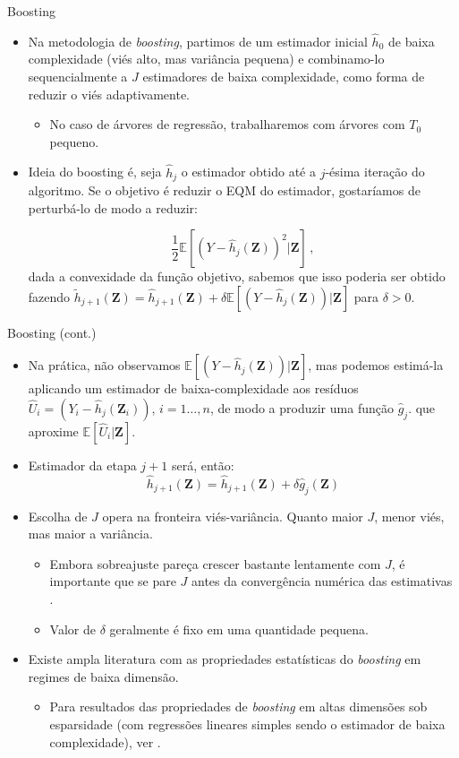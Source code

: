 \documentclass[11pt]{beamer}
\begin{document}
\begin{frame}{Boosting}
	\begin{itemize}
		\item Na metodologia de \textit{boosting}, partimos de um estimador inicial $\hat{h}_0$ de baixa complexidade (viés alto, mas variância pequena) e combinamo-lo sequencialmente a $J$ estimadores de baixa complexidade, como forma de reduzir o viés adaptivamente.
		\begin{itemize}
			\item No caso de árvores de regressão, trabalharemos com árvores com $T_0$ pequeno.
		\end{itemize}
		\item Ideia do boosting é, seja $\hat{h}_j$ o estimador obtido até a $j$-ésima iteração do algoritmo. Se o objetivo é reduzir o EQM do estimador, gostaríamos de perturbá-lo de modo a reduzir:
		
		$$\frac{1}{2}\mathbb{E}[(Y-\hat{h}_j(\boldsymbol{Z}))^2|\boldsymbol{Z}]\, ,$$
		dada a convexidade da função objetivo, sabemos que isso poderia ser  obtido fazendo
		$\tilde{h}_{j+1}(\boldsymbol{Z}) = \hat{h}_{j+1}(\boldsymbol{Z}) +\delta \mathbb{E}[(Y-\hat{h}_j(\boldsymbol{Z}))|\boldsymbol{Z}]$
		para $\delta>0$.
		
	\end{itemize}
\end{frame}
\begin{frame}{Boosting (cont.)}
\begin{itemize}
	 \item Na prática, não observamos $ \mathbb{E}[(Y-\hat{h}_j(\boldsymbol{Z}))|\boldsymbol{Z}]$, mas podemos estimá-la aplicando um estimador de baixa-complexidade aos resíduos $\hat{U}_i = (Y_i-\hat{h}_j(\boldsymbol{Z}_i))$, $i=1\ldots, n$, de modo a produzir uma função $\hat{g}_j$. que aproxime $\mathbb{E}[\hat{U}_i|\boldsymbol{Z}]$.
	 \item Estimador da etapa $j+1$ será, então:
	$$\hat{h}_{j+1}(\boldsymbol{Z}) = \hat{h}_{j+1}(\boldsymbol{Z}) +\delta \hat{g}_j(\boldsymbol{Z})$$
	\item Escolha de $J$ opera na fronteira viés-variância. Quanto maior $J$, menor viés, mas maior a variância.
	\begin{itemize}
		\item Embora sobreajuste pareça crescer bastante lentamente com $J$, é importante que se pare $J$ antes da convergência numérica das estimativas \citep{buhlmann2003,buhlmann2007}.
		\item Valor de $\delta$ geralmente é fixo em uma quantidade pequena.
	\end{itemize}

		\item Existe ampla literatura com as propriedades estatísticas do \textit{boosting} em regimes de baixa dimensão.
		\begin{itemize}
	\item Para resultados das propriedades de \textit{boosting} em altas dimensões sob esparsidade (com regressões lineares simples sendo o estimador de baixa complexidade), ver \citet{Kueck2023}.
	\end{itemize}
\end{itemize}
\end{frame}
\end{document}
